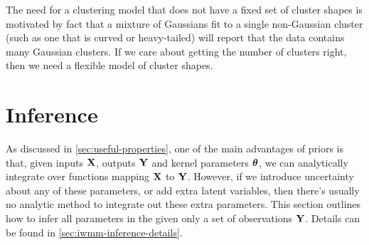 The need for a clustering model that does not have a fixed set of cluster shapes is motivated by fact that
a mixture of Gaussians fit to a single non-Gaussian cluster (such as one that is curved or heavy-tailed) will report that the data contains many Gaussian clusters.
If we care about getting the number of clusters right, then we need a flexible model of cluster shapes.






%
%








\section{Inference}
\label{sec:iwmm-inference}

As discussed in \cref{sec:useful-properties}, one of the main advantages of \gp{} priors is that, given inputs $\mathbf{X}$, outputs $\mathbf{Y}$ and kernel parameters ${\boldsymbol{\theta}}$, we can analytically integrate over functions mapping $\mathbf{X}$ to $\mathbf{Y}$.
However, if we introduce uncertainty about any of these parameters, or add extra latent variables, then there's usually no analytic method to integrate out these extra parameters.
This section outlines how to infer all parameters in the \iwmm{} given only a set of observations $\mathbf{Y}$.
Details can be found in \cref{sec:iwmm-inference-details}.


